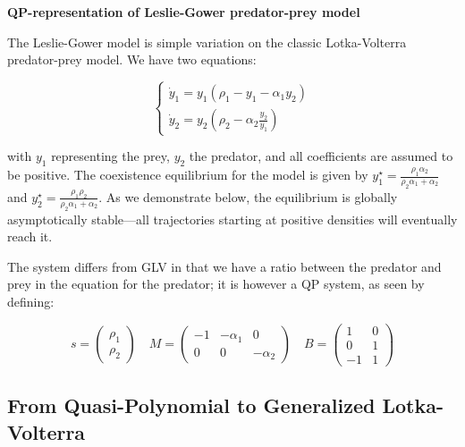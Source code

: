 \documentclass{article}
\begin{document}
\begin{cb}
\textbf{QP-representation of Leslie-Gower predator-prey model}

The Leslie-Gower model is simple variation on the classic Lotka-Volterra predator-prey model. We have two equations:

\begin{equation}
\label{eq:lg}
\begin{cases}
\dot{y}_1 = y_1 (\rho_1 - y_1- \alpha_1 y_2)\\
\dot{y}_2 = y_2 \left(\rho_2 - \alpha_2 \frac{y_2}{y_1} \right)
\end{cases}
\end{equation}

with $y_1$ representing the prey, $y_2$ the predator, and all coefficients are assumed to be positive. The coexistence equilibrium for the model is given by $y_1^\star = \frac{\rho_1 \alpha_2}{\rho_2 \alpha_1 + \alpha_2}$ and $y_2^\star = \frac{\rho_1 \rho_2}{\rho_2 \alpha_1 + \alpha_2}$. As we demonstrate below, the equilibrium is globally asymptotically stable---all trajectories starting at positive densities will eventually reach it.

The system differs from GLV in that we have a ratio between the predator and prey in the equation for the predator; it is however a QP system, as seen by defining:

\begin{equation}
\label{eq:lgqp}
s = \begin{pmatrix}
\rho_1\\
\rho_2
\end{pmatrix} \quad 
M = \begin{pmatrix}
-1 & -\alpha_1 & 0\\
0 & 0 & -\alpha_2
\end{pmatrix} \quad
B = \begin{pmatrix}
1 & 0 \\
0 & 1 \\
-1 & 1
\end{pmatrix}
\end{equation}

\end{cb}

\hypertarget{from-quasi-polynomial-to-generalized-lotka-volterra}{%
\subsection{From Quasi-Polynomial to Generalized
Lotka-Volterra}\label{from-quasi-polynomial-to-generalized-lotka-volterra}}
\end{document}
